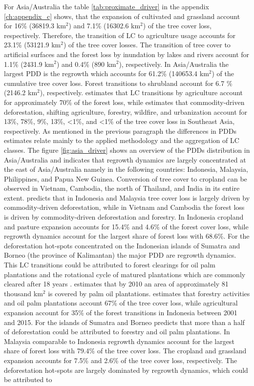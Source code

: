 			For Asia/Australia the table \ref{tab:proximate_driver} in the appendix \ref{ch:appendix_c} shows, that the expansion of cultivated and grassland account for 16\% (36819.3 km$^2$) and 7.1\% (16302.6 km$^2$) of the tree cover loss, respectively. Therefore, the transition of \ac{LC} to agriculture usage accounts for 23.1\% (53121.9 km$^2$) of the tree cover losses. The transition of tree cover to artificial surfaces and the forest loss by inundation by lakes and rivers account for 1.1\% (2431.9 km$^2$) and 0.4\% (890 km$^2$), respectively. In Asia/Australia the largest \ac{PDD} is the regrowth which accounts for 61.2\% (140653.4 km$^2$) of the cumulative tree cover loss. Forest transitions to shrubland account for 6.7 \% (2146.2 km$^2$), respectively. \citet{Hosonuma2012} estimates that \ac{LC} transitions by agriculture account for approximately 70\% of the forest loss, while \citet{Curtis2018} estimates that commodity-driven deforestation, shifting agriculture, forestry, wildfire, and urbanization account for 13\%, 78\%, 9\%, 13\%, <1\%, and <1\% of the tree cover loss in Southeast Asia, respectively. As mentioned in the previous paragraph the differences in \acp{PDD} estimates relate mainly to the applied methodology and the aggregation of \ac{LC} classes. The figure \ref{fig:asia_driver} shows an overview of the \acp{PDD} distribution in Asia/Australia and indicates that regrowth dynamics are largely concentrated at the east of Asia/Australia namely in the following countries: Indonesia, Malaysia, Philippines, and Papua New Guinea. Conversion of tree cover to cropland can be observed in Vietnam, Cambodia, the north of Thailand, and India in its entire extent. \citeauthor{Curtis2018} predicts that in Indonesia and Malaysia tree cover loss is largely driven by commodity-driven deforestation, while in Vietnam and Cambodia the forest loss is driven by commodity-driven deforestation and forestry. In Indonesia cropland and pasture expansion accounts for 15.4\% and 4.6\% of the forest cover loss, while regrowth dynamics account for the largest share of forest loss with 68.6\%. For the deforestation hot-spots concentrated on the Indonesian islands of Sumatra and Borneo (the province of Kalimantan) the major \ac{PDD} are regrowth dynamics. This \ac{LC} transitions could be attributed to forest clearings for oil palm plantations and the rotational cycle of matured plantations which are commonly cleared after 18 years \citep{Corley2016}. \citeauthor{Corley2016} estimates that by 2010 an area of approximately 81 thousand km$^2$ is covered by palm oil plantations. \citet{Austin2019} estimates that forestry activities and oil palm plantations account 67\% of the tree cover loss, while agricultural expansion account for 35\% of the forest transitions in Indonesia between 2001 and 2015. For the islands of Sumatra and Borneo \citeauthor{Austin2019} predicts that more than a half of deforestation could be attributed to forestry and oil palm plantations. In Malaysia comparable to Indonesia regrowth dynamics account for the largest share of forest loss with 79.4\% of the tree cover loss. The cropland and grassland expansion accounts for 7.5\% and 2.6\% of the tree cover loss, respectively. The deforestation hot-spots are largely dominated by regrowth dynamics, which could be attributed to 